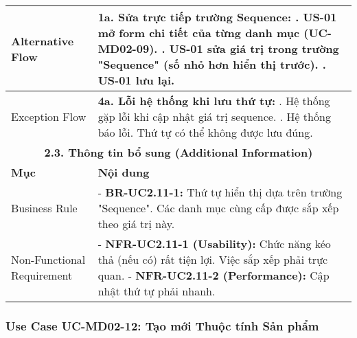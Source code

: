 \begin{longtable}{|m{4cm}|p{11cm}|}
Alternative Flow & \textbf{1a. Sửa trực tiếp trường Sequence:} \newline    1. US-01 mở form chi tiết của từng danh mục (UC-MD02-09). \newline    2. US-01 sửa giá trị trong trường "Sequence" (số nhỏ hơn hiển thị trước). \newline    3. US-01 lưu lại. \\
\hline
Exception Flow & \textbf{4a. Lỗi hệ thống khi lưu thứ tự:} \newline    1. Hệ thống gặp lỗi khi cập nhật giá trị sequence. \newline    2. Hệ thống báo lỗi. Thứ tự có thể không được lưu đúng. \\
\hline
\multicolumn{2}{|c|}{\textbf{2.3. Thông tin bổ sung (Additional Information)}} \\
\hline
\textbf{Mục} & \textbf{Nội dung} \\
\hline
Business Rule & - \textbf{BR-UC2.11-1:} Thứ tự hiển thị dựa trên trường "Sequence". Các danh mục cùng cấp được sắp xếp theo giá trị này. \\
\hline
Non-Functional Requirement & - \textbf{NFR-UC2.11-1 (Usability):} Chức năng kéo thả (nếu có) rất tiện lợi. Việc sắp xếp phải trực quan. \newline - \textbf{NFR-UC2.11-2 (Performance):} Cập nhật thứ tự phải nhanh. \\
\hline
\end{longtable}

\subsubsection{Use Case UC-MD02-12: Tạo mới Thuộc tính Sản phẩm}

